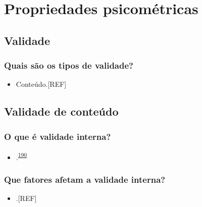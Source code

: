 \documentclass[
  a4paper,
]{book}
\providecommand{\tightlist}{%
  \setlength{\itemsep}{0pt}\setlength{\parskip}{0pt}}
\begin{document}
\hypertarget{propriedades-psicometricas}{%
\chapter{\texorpdfstring{\textbf{Propriedades psicométricas}}{Propriedades psicométricas}}\label{propriedades-psicometricas}}

\hypertarget{validade}{%
\section{Validade}\label{validade}}

\hypertarget{quais-suxe3o-os-tipos-de-validade}{%
\subsection{Quais são os tipos de validade?}\label{quais-suxe3o-os-tipos-de-validade}}

\begin{itemize}
\tightlist
\item
  Conteúdo.{[}REF{]}
\end{itemize}

\hypertarget{validade-conteuxfado}{%
\section{Validade de conteúdo}\label{validade-conteuxfado}}

\hypertarget{o-que-uxe9-validade-interna}{%
\subsection{O que é validade interna?}\label{o-que-uxe9-validade-interna}}

\begin{itemize}
\tightlist
\item
  .\textsuperscript{\protect\hyperlink{ref-findley2021}{190}}
\end{itemize}

\hypertarget{que-fatores-afetam-a-validade-interna}{%
\subsection{Que fatores afetam a validade interna?}\label{que-fatores-afetam-a-validade-interna}}

\begin{itemize}
\tightlist
\item
  .{[}REF{]}
\end{itemize}
\end{document}
